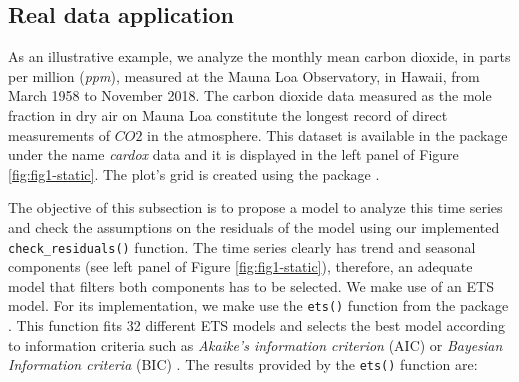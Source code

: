 \subsection{Real data application}\label{real-data-application}

As an illustrative example, we analyze the monthly mean carbon dioxide, in parts per million (\emph{ppm}), measured at the Mauna Loa Observatory, in Hawaii, from March 1958 to November 2018. The carbon dioxide data measured as the mole fraction in dry air on Mauna Loa constitute the longest record of direct measurements of \(CO2\) in the atmosphere. This dataset is available in the  package \citep{astsa} under the name \emph{cardox} data and it is displayed in the left panel of Figure \ref{fig:fig1-static}. The plot's grid is created using the  package \citep{cowplot}.

The objective of this subsection is to propose a model to analyze this time series and check the assumptions on the residuals of the model using our implemented \texttt{check\_residuals()} function. The time series clearly has trend and seasonal components (see left panel of Figure \ref{fig:fig1-static}), therefore, an adequate model that filters both components has to be selected. We make use of an ETS model. For its implementation, we make use the \texttt{ets()} function from the  package \citep{Rob2007}. This function fits 32 different ETS models and selects the best model according to information criteria such as \emph{Akaike's information criterion} (AIC) or \emph{Bayesian Information criteria} (BIC) \citep{BIC2006}.
The results provided by the \texttt{ets()} function are:

